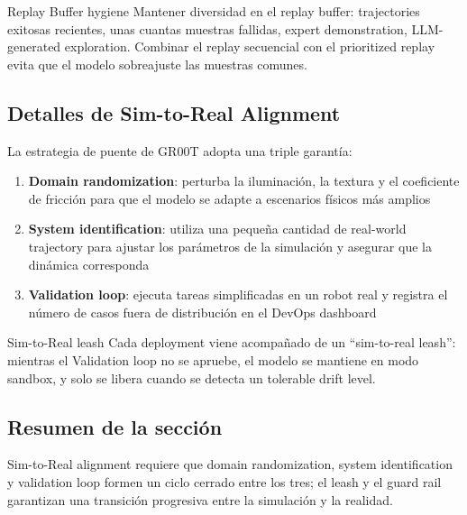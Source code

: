 \begin{importantbox}{Replay Buffer hygiene}
Mantener diversidad en el replay buffer: trajectories exitosas recientes, unas cuantas muestras fallidas, expert demonstration, LLM-generated exploration. Combinar el replay secuencial con el prioritized replay evita que el modelo sobreajuste las muestras comunes.
\end{importantbox}

\subsection{Detalles de Sim-to-Real Alignment}

La estrategia de puente de GR00T adopta una triple garantía:

\begin{enumerate}
    \item \textbf{Domain randomization}: perturba la iluminación, la textura y el coeficiente de fricción para que el modelo se adapte a escenarios físicos más amplios
    \item \textbf{System identification}: utiliza una pequeña cantidad de real-world trajectory para ajustar los parámetros de la simulación y asegurar que la dinámica corresponda
    \item \textbf{Validation loop}: ejecuta tareas simplificadas en un robot real y registra el número de casos fuera de distribución en el DevOps dashboard
\end{enumerate}

\begin{importantbox}{Sim-to-Real leash}
Cada deployment viene acompañado de un ``sim-to-real leash'': mientras el Validation loop no se apruebe, el modelo se mantiene en modo sandbox, y solo se libera cuando se detecta un tolerable drift level.
\end{importantbox}

\subsection{Resumen de la sección}

Sim-to-Real alignment requiere que domain randomization, system identification y validation loop formen un ciclo cerrado entre los tres; el leash y el guard rail garantizan una transición progresiva entre la simulación y la realidad.

